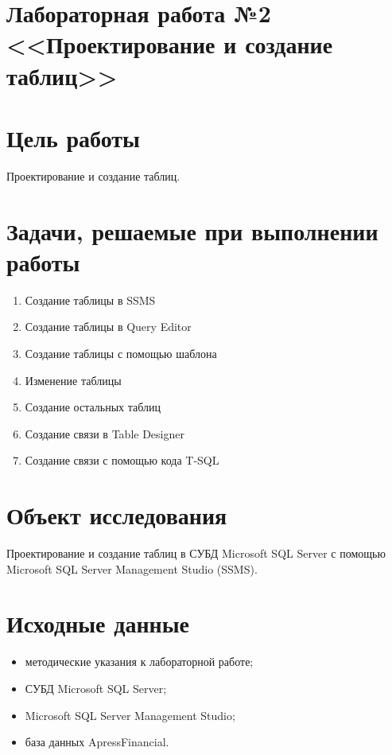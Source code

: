 \documentclass[a4paper, 14pt]{extarticle}
\begin{document}
\setcounter{page}{2}

\linespread{1.5}
\renewcommand{\baselinestretch}{1.5}

\section*{\large{Лабораторная работа №2 <<Проектирование и создание таблиц>>}}

\section{Цель работы}

Проектирование и создание таблиц.

\section{Задачи, решаемые при выполнении работы}

\begin{enumerate}[leftmargin=*]
  \item Создание таблицы в SSMS
  \item Создание таблицы в Query Editor
  \item Создание таблицы с помощью шаблона
  \item Изменение таблицы
  \item Создание остальных таблиц
  \item Создание связи в Table Designer
  \item Создание связи с помощью кода T-SQL
\end{enumerate}

\section{Объект исследования}

Проектирование и создание таблиц в СУБД Microsoft SQL Server с помощью Microsoft
SQL Server Management Studio (SSMS).

\section{Исходные данные}

\begin{itemize}
  \item методические указания к лабораторной работе;
  \item СУБД Microsoft SQL Server;
  \item Microsoft SQL Server Management Studio;
  \item база данных ApressFinancial.
\end{itemize}
\end{document}
